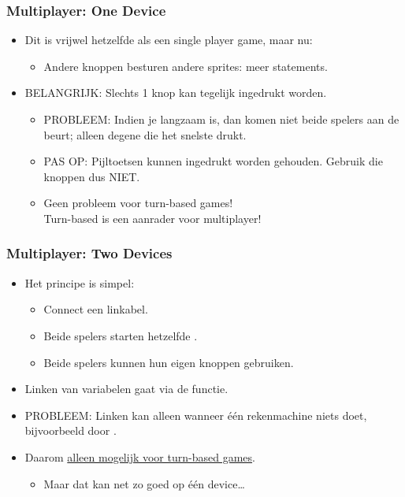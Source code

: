 \begin{frame}
\frametitle{Multiplayer: One Device}

\begin{itemize}
  \item<1-> Dit is vrijwel hetzelfde als een single player game, maar nu:
  \begin{itemize}
    \item<2-> Andere knoppen besturen andere sprites: meer  statements.
  \end{itemize}
  \item<3-> BELANGRIJK: Slechts 1 knop kan tegelijk ingedrukt worden.
  \begin{itemize}
    \item<4-> PROBLEEM: Indien je  langzaam is, dan komen niet beide spelers aan de beurt; alleen degene die het snelste drukt.
    \item<5-> PAS OP: Pijltoetsen kunnen ingedrukt worden gehouden. Gebruik die knoppen dus NIET.
    \item<6-> Geen probleem voor turn-based games!\\
    		  Turn-based is een aanrader voor multiplayer!
  \end{itemize}
\end{itemize}

\end{frame}






\begin{frame}
\frametitle{Multiplayer: Two Devices}

\begin{itemize}
  \item<1-> Het principe is simpel:
  \begin{itemize}
    \item<2-> Connect een linkabel.
    \item<3-> Beide spelers starten hetzelfde .
    \item<4-> Beide spelers kunnen hun eigen knoppen gebruiken.
  \end{itemize}
  \item<5-> Linken van variabelen gaat via de  functie.
  \item<6-> PROBLEEM: Linken kan alleen wanneer \'e\'en rekenmachine niets doet, bijvoorbeeld door .
  \item<7-> Daarom \underline{alleen mogelijk voor turn-based games}.
  \begin{itemize}
    \item<8-> Maar dat kan net zo goed op \'e\'en device\ldots
  \end{itemize}  
\end{itemize}

\end{frame}












